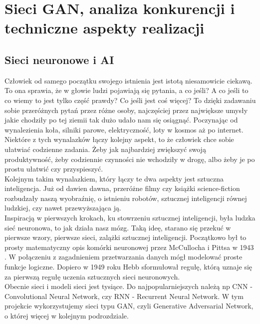 \documentclass[12pt]{article}
\begin{document}
\begin{sloppypar}
\section{Sieci GAN, analiza konkurencji i techniczne aspekty realizacji}
{
  \subsection{Sieci neuronowe i AI}
  {
    Człowiek od samego początku swojego istnienia jest istotą niesamowicie ciekawą. 
    To ona sprawia, że w głowie ludzi pojawiają się pytania, a co jeśli? 
    A co jeśli to co wiemy to jest tylko część prawdy? Co jeśli jest coś więcej?
    To dzięki zadawaniu sobie przeróżnych pytań przez różne osoby, najczęściej przez największe umysły jakie chodziły po tej ziemii tak dużo udało nam się osiągnąć.
    Poczynając od wynalezienia koła, silniki parowe, elektryczność, loty w kosmos aż po internet. 
    Niektóre z tych wynalazków łączy kolejny aspekt, to że człowiek chce sobie ułatwiać codzienne zadania. 
    Żeby jak najbardziej zwiększyć swoją produktywność, żeby codziennie czynności nie wchodziły w drogę, albo żeby je po prostu ułatwić czy przyspieszyć. \\
    Kolejnym takim wynalazkiem, który łączy te dwa aspekty jest sztuczna inteligencja. 
    Już od dawien dawna, przeróżne filmy czy książki science-fiction rozbudzały naszą wyobraźnię, o istnieniu robotów, sztucznej inteligencji równej ludzkiej, czy nawet przewyższająca ją. \\
    Inspiracją w pierwszych krokach, ku stowrzeniu sztucznej inteligencji, była ludzka sieć neuronowa, to jak działa nasz mózg. 
    Taką ideę, starano się przekuć w pierwsze wzory, pierwsze sieci, zalążki sztucznej inteligencji. 
    Początkowo był to prosty matematyczny opis komórki neuronowej przez McCullocha i Pittsa w 1943 \cite{sztuczna-inteligencja}.
    W połączeniu z zagadnieniem przetwarzania danych mógł modelować proste funkcje logiczne. 
    Dopiero w 1949 roku Hebb sformułował regułę, którą uznaje się za pierwszą regułę uczenia sztucznych sieci neuronowych\cite{sztuczna-inteligencja}.\\
    Obecnie sieci i modeli sieci jest tysiące. Do najpopularniejszych należą np CNN - Convolutional Neural Network, czy RNN - Recurrent Neural Network.
    W tym projekcie wykorzystujemy sieci typu GAN, czyli Generative Adversarial Network, o której więcej w kolejnym podrozdziale.
  }
}
\end{sloppypar}
\end{document}
